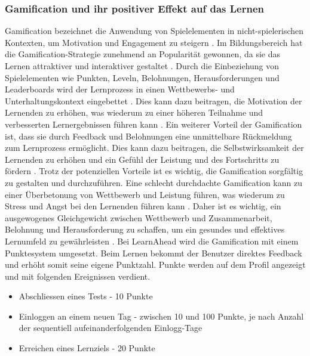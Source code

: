 \subsubsection{Gamification und ihr positiver Effekt auf das Lernen}
Gamification bezeichnet die Anwendung von Spielelementen in nicht-spielerischen Kontexten, um Motivation und Engagement zu steigern \cite{Deterding2011}. Im Bildungsbereich hat die Gamification-Strategie zunehmend an Popularität gewonnen, da sie das Lernen attraktiver und interaktiver gestaltet \cite{Hamari2014}.\newline
Durch die Einbeziehung von Spielelementen wie Punkten, Leveln, Belohnungen, Herausforderungen und Leaderboards wird der Lernprozess in einen Wettbewerbs- und Unterhaltungskontext eingebettet \cite{Kapp2012}. Dies kann dazu beitragen, die Motivation der Lernenden zu erhöhen, was wiederum zu einer höheren Teilnahme und verbesserten Lernergebnissen führen kann \cite{Hanus2015}.\newline
Ein weiterer Vorteil der Gamification ist, dass sie durch Feedback und Belohnungen eine unmittelbare Rückmeldung zum Lernprozess ermöglicht. Dies kann dazu beitragen, die Selbstwirksamkeit der Lernenden zu erhöhen und ein Gefühl der Leistung und des Fortschritts zu fördern \cite{Landers2014}. \newline
Trotz der potenziellen Vorteile ist es wichtig, die Gamification sorgfältig zu gestalten und durchzuführen. Eine schlecht durchdachte Gamification kann zu einer Überbetonung von Wettbewerb und Leistung führen, was wiederum zu Stress und Angst bei den Lernenden führen kann \cite{Nicholson2015}. Daher ist es wichtig, ein ausgewogenes Gleichgewicht zwischen Wettbewerb und Zusammenarbeit, Belohnung und Herausforderung zu schaffen, um ein gesundes und effektives Lernumfeld zu gewährleisten \cite{Deterding2011}.\newline
Bei LearnAhead wird die Gamification mit einem Punktesystem umgesetzt. Beim Lernen bekommt der Benutzer direktes Feedback und erhöht somit seine eigene Punktzahl. Punkte werden auf dem Profil angezeigt und mit folgenden Ereignissen verdient.
\begin{itemize}
  \item Abschliessen eines Tests - 10 Punkte
  \item Einloggen an einem neuen Tag - zwischen 10 und 100 Punkte, je nach Anzahl der sequentiell aufeinanderfolgenden Einlogg-Tage
  \item Erreichen eines Lernziels - 20 Punkte
\end{itemize}

